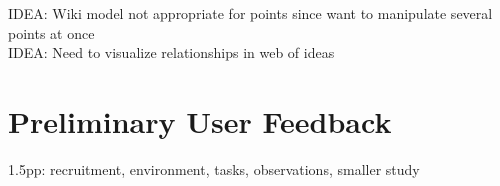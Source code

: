 \documentclass{chi2009}
\newcommand{\idea}[1]{{\color{blue} IDEA: #1}\\}
\begin{document}
\idea{Wiki model not appropriate for points since want to manipulate several points at once}
\idea{Need to visualize relationships in web of ideas}


% 
% 
% 
% 


\section{Preliminary User Feedback}


1.5pp: recruitment, environment, tasks, observations, smaller study
\end{document}
